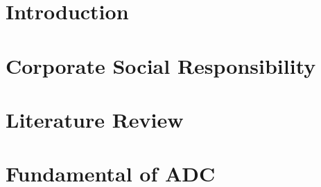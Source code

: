 \documentclass[Times,12pt,oneside,openany,print,index]{report}
\let\cleardoublepage=\clearpage %
\begin{document}
\thispagestyle{empty} %
\cleardoublepage



{}



\renewcommand{\contentsname}{Table of Contents} %
\cleardoublepage
{}
{} %
\tableofcontents %

\listoffigures %
\listoftables %

\printnomenclature %
\cleardoublepage


\chapter{Introduction}\label{introduction}

\chapter{Corporate Social Responsibility}\label{Corporate}

\chapter{Literature Review}\label{Literature}



\chapter{Fundamental of ADC}\label{Fundamental of ADC}
\end{document}
